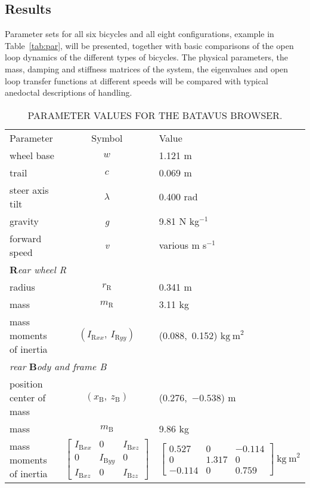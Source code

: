 \documentclass{bmd2010a}
\begin{document}
\subsection*{Results}
Parameter sets for all six bicycles and all eight
configurations, example in Table~\ref{tab:par},  will be
presented, together with basic comparisons of the open loop dynamics of the
different types of bicycles. The physical parameters, the mass, damping and stiffness
matrices of the system, the eigenvalues and open loop transfer functions at
different speeds will be compared with typical anedoctal
descriptions of handling.
\begin{table*}[tb]
\centering
\caption{PARAMETER VALUES FOR THE BATAVUS BROWSER.}
{\small
\begin{tabular}{lcl}
&&\\
\hline
Parameter & Symbol & Value \\
\hline
wheel base & $w$ & 1.121 m \\
trail & $c$ & 0.069 m \\
steer axis tilt & \emph{$\lambda$} & 0.400 rad \\
gravity & \emph{g} & 9.81 N kg$^{-1}$ \\
forward speed & \emph{v} & various m s$^{-1}$ \\

\multicolumn{3}{l}{\textbf{R}\emph{ear wheel R}}\\
radius & \emph{$r_\mathrm{R}$} & 0.341 m\\
mass & \emph{$m_\mathrm{R}$} &  3.11 kg \\
mass moments of inertia & \emph{$(I_{\mathrm{R}xx},\
I_{\mathrm{R}yy})$} &
(0.088,\ 0.152) $\mathrm{kg\ m}^2$ \\

\multicolumn{3}{l}{\emph{rear} \textbf{B}\emph{ody and frame B}}\\
position center of mass & \emph{$(x_\mathrm{B},\ z_\mathrm{B})$} &
($0.276$,\ $-0.538$) m\\
mass & \emph{$m_\mathrm{B}$} & 9.86 kg \\
mass moments of inertia & $\left[ \begin{array}{ccc}
I_{\mathrm{B}xx} &  0 & I_{\mathrm{B}xz}\\
0 & I_{\mathrm{B}yy} & 0 \\
I_{\mathrm{B}xz} & 0 & I_{\mathrm{B}zz}
\end{array} \right] $ &
$\left[ \begin{array}{ccc}
0.527 &  0 & -0.114\\
0 & 1.317 & 0 \\
-0.114 & 0 & 0.759
\end{array} \right] \ \mathrm{kg\ m}^{2}$\\


\end{tabular}}
\end{table*}
\end{document}
